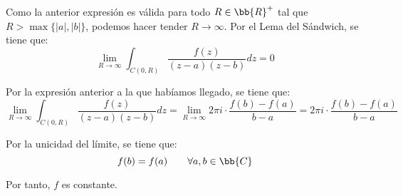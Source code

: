 \documentclass[12pt]{article}
\begin{document}
\begin{ejercicio}[3 puntos]
    Como la anterior expresión es válida para todo $R\in \bb{R}^+$ tal que $R>\max\{|a|,|b|\}$, podemos hacer tender $R\to \infty$. Por el Lema del Sándwich, se tiene que:
    \begin{equation*}
        \lim_{R\to \infty} \int_{C(0,R)} \frac{f(z)}{(z-a)(z-b)}dz = 0
    \end{equation*}

    Por la expresión anterior a la que habíamos llegado, se tiene que:
    \begin{equation*}
        \lim_{R\to \infty} \int_{C(0,R)} \frac{f(z)}{(z-a)(z-b)}dz = \lim_{R\to \infty} 2\pi i \cdot \frac{f(b)-f(a)}{b-a} = 2\pi i \cdot \frac{f(b)-f(a)}{b-a}
    \end{equation*}

    Por la unicidad del límite, se tiene que:
    \begin{equation*}
        f(b)=f(a) \qquad \forall a,b\in \bb{C}
    \end{equation*}

    Por tanto, $f$ es constante.
    \end{ejercicio}
\end{document}
